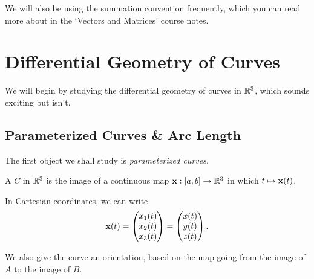 \documentclass[a4paper]{scrartcl}
\begin{document}
We will also be using the summation convention frequently, which you can read more about in the `Vectors and Matrices' course notes.

\section{Differential Geometry of Curves}

We will begin by studying the differential geometry of curves in $\mathbb{R}^3$, which sounds exciting but isn't.

\subsection{Parameterized Curves \& Arc Length}

The first object we shall study is \emph{parameterized curves}.

\begin{definition}
	A  $C$ in $\mathbb{R}^3$ is the image of a continuous map $\mathbf{x} : [a, b] \rightarrow \mathbb{R}^3$ in which $t \mapsto \mathbf{x}(t)$.
\end{definition}

In Cartesian coordinates, we can write
$$
\mathbf{x}(t) = \begin{pmatrix}
	x_1 (t) \\
	x_2 (t) \\
	x_3(t)
\end{pmatrix} = \begin{pmatrix}
	x (t) \\
	y (t) \\
	z (t)
\end{pmatrix}.
$$

We also give the curve an orientation, based on the map going from the image of $A$ to the image of $B$.
\end{document}
